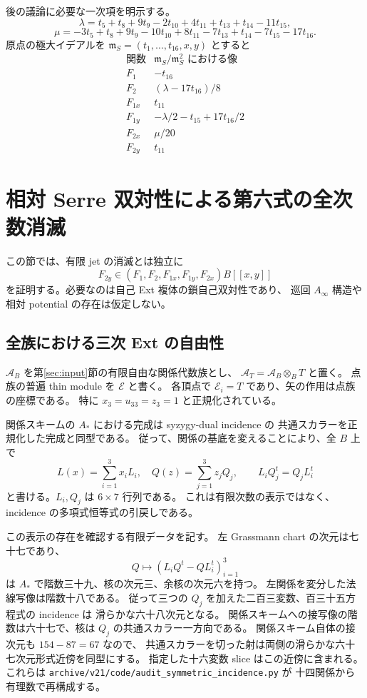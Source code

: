 後の議論に必要な一次項を明示する。
\[
 \lambda=t_5+t_8+9t_9-2t_{10}+4t_{11}+t_{13}+t_{14}-11t_{15},
\]
\[
 \mu=-3t_5+t_8+9t_9-10t_{10}+8t_{11}-7t_{13}
       +t_{14}-7t_{15}-17t_{16}.
\]
原点の極大イデアルを $\mathfrak m_S=(t_1,\ldots,t_{16},x,y)$ とすると
\begin{equation}\label{eq:linear-six}
\begin{array}{c|c}
\text{関数}&\mathfrak m_S/\mathfrak m_S^2\text{ における像}\\\hline
F_1&-t_{16}\\
F_2&(\lambda-17t_{16})/8\\
F_{1x}&t_{11}\\
F_{1y}&-\lambda/2-t_{15}+17t_{16}/2\\
F_{2x}&\mu/20\\
F_{2y}&t_{11}
\end{array}
\end{equation}

\section{相対 Serre 双対性による第六式の全次数消滅}\label{sec:serre-vanishing}

この節では、有限 jet の消滅とは独立に
\[
 F_{2y}\in(F_1,F_2,F_{1x},F_{1y},F_{2x})B[[x,y]]
\]
を証明する。必要なのは自己 Ext 複体の鎖自己双対性であり、
巡回 $A_\infty$ 構造や相対 potential の存在は仮定しない。

\subsection{全族における三次 Ext の自由性}

$\mathcal A_B$ を第\ref{sec:input}節の有限自由な関係代数族とし、
$\mathcal A_T=\mathcal A_B\otimes_BT$ と置く。
点族の普遍 thin module を $\mathcal E$ と書く。
各頂点で $\mathcal E_i=T$ であり、矢の作用は点族の座標である。
特に $x_3=u_{33}=z_3=1$ と正規化されている。

関係スキームの $A_*$ における完成は syzygy-dual incidence の
共通スカラーを正規化した完成と同型である。
従って、関係の基底を変えることにより、全 $B$ 上で
\begin{equation}\label{eq:relative-dual-incidence}
 L(x)=\sum_{i=1}^3x_iL_i,\quad
 Q(z)=\sum_{j=1}^3z_jQ_j,\qquad
 L_iQ_j^t=Q_jL_i^t
\end{equation}
と書ける。$L_i,Q_j$ は $6\times7$ 行列である。
これは有限次数の表示ではなく、incidence の多項式恒等式の引戻しである。

この表示の存在を確認する有限データを記す。
左 Grassmann chart の次元は七十七であり、
\[
 Q\longmapsto (L_iQ^t-QL_i^t)_{i=1}^3
\]
は $A_*$ で階数三十九、核の次元三、余核の次元六を持つ。
左関係を変分した法線写像は階数十八である。
従って三つの $Q_j$ を加えた二百三変数、百三十五方程式の incidence は
滑らかな六十八次元となる。
関係スキームへの接写像の階数は六十七で、核は $Q_j$ の共通スカラー一方向である。
関係スキーム自体の接次元も $154-87=67$ なので、
共通スカラーを切った射は両側の滑らかな六十七次元形式近傍を同型にする。
指定した十六変数 slice はこの近傍に含まれる。
これらは \nolinkurl{archive/v21/code/audit_symmetric_incidence.py} が
十四関係から有理数で再構成する。

